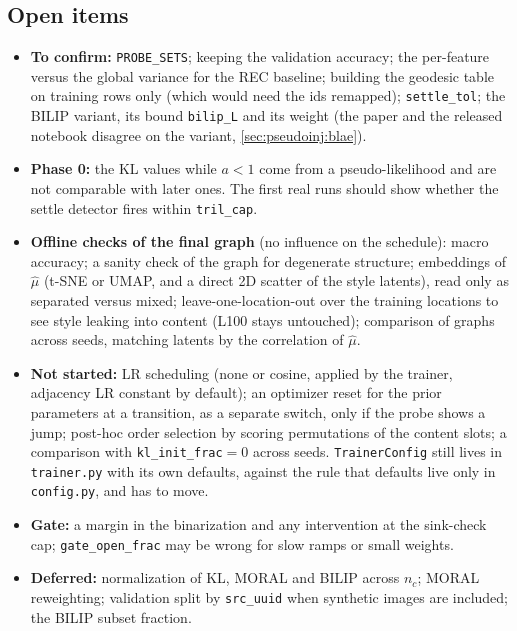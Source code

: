 \subsection{Open items}
\label{sec:schedule:open}
\begin{itemize}[leftmargin=1.5em]
\item \textbf{To confirm:} \texttt{PROBE\_SETS}; keeping the validation accuracy; the
      per-feature versus the global variance for the REC baseline; building the
      geodesic table on training rows only (which would need the ids remapped);
      \texttt{settle\_tol}; the BILIP variant, its bound \texttt{bilip\_L} and its
      weight (the paper and the released notebook disagree on the variant,
      \cref{sec:pseudoinj:blae}).
\item \textbf{Phase 0:} the KL values while $a<1$ come from a pseudo-likelihood and are
      not comparable with later ones. The first real runs should show whether the
      settle detector fires within \texttt{tril\_cap}.
\item \textbf{Offline checks of the final graph} (no influence on the schedule): macro
      accuracy; a sanity check of the graph for degenerate structure; embeddings of
      $\hat\mu$ (t-SNE or UMAP, and a direct 2D scatter of the style latents), read
      only as separated versus mixed; leave-one-location-out over the training
      locations to see style leaking into content (L100 stays untouched); comparison
      of graphs across seeds, matching latents by the correlation of $\hat\mu$.
\item \textbf{Not started:} LR scheduling (none or cosine, applied by the trainer,
      adjacency LR constant by default); an optimizer reset for the prior parameters
      at a transition, as a separate switch, only if the probe shows a jump;
      post-hoc order selection by scoring permutations of the content slots; a
      comparison with \texttt{kl\_init\_frac}$=0$ across seeds. \texttt{TrainerConfig}
      still lives in \texttt{trainer.py} with its own defaults, against the rule that
      defaults live only in \texttt{config.py}, and has to move.
\item \textbf{Gate:} a margin in the binarization and any intervention at the
      sink-check cap; \texttt{gate\_open\_frac} may be wrong for slow ramps or small
      weights.
\item \textbf{Deferred:} normalization of KL, MORAL and BILIP across $n_c$; MORAL
      reweighting; validation split by \texttt{src\_uuid} when synthetic images are
      included; the BILIP subset fraction.

\end{itemize}

